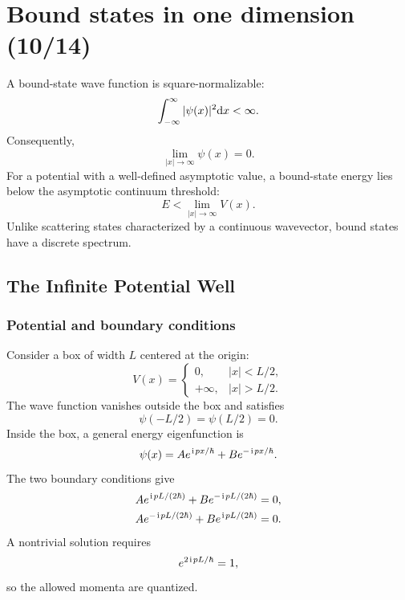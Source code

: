 \section{Bound states in one dimension (10/14)}


A bound-state wave function is square-normalizable:
\begin{equation}
 \int_{-\infty}^{\infty}|\psi(x)|^2\mathrm{d} x<\infty.
\end{equation}
Consequently,
\begin{equation}
 \lim_{|x|\to\infty}\psi(x)=0.
\end{equation}
For a potential with a well-defined asymptotic value, a bound-state energy
lies below the asymptotic continuum threshold:
\begin{equation}
 E<\lim_{|x|\to\infty}V(x).
\end{equation}
Unlike scattering states characterized by a continuous wavevector, bound states have a discrete spectrum. 

\subsection{The Infinite Potential Well}

\subsubsection{Potential and boundary conditions}
Consider a box of width $L$ centered at the origin:
\begin{equation}
 V(x)=
 \begin{cases}
 0, & |x|<L/2,\\
 +\infty, & |x|>L/2.
 \end{cases}
\end{equation}
The wave function vanishes outside the box and satisfies
\begin{equation}
 \psi(-L/2)=\psi(L/2)=0.
\end{equation}
Inside the box, a general energy eigenfunction is
\begin{equation}
 \psi(x)=A e^{\hspace{1pt}\mathrm{i}\hspace{1pt} px/\hbar}+B e^{-\hspace{1pt}\mathrm{i}\hspace{1pt} px/\hbar}.
\end{equation}
The two boundary conditions give
\begin{align}
 A e^{\hspace{1pt}\mathrm{i}\hspace{1pt} pL/(2\hbar)}+B e^{-\hspace{1pt}\mathrm{i}\hspace{1pt} pL/(2\hbar)}&=0,\\
 A e^{-\hspace{1pt}\mathrm{i}\hspace{1pt} pL/(2\hbar)}+B e^{\hspace{1pt}\mathrm{i}\hspace{1pt} pL/(2\hbar)}&=0.
\end{align}
A nontrivial solution requires
\begin{equation}
 e^{2\hspace{1pt}\mathrm{i}\hspace{1pt} pL/\hbar}=1,
\end{equation}
so the allowed momenta are quantized.

